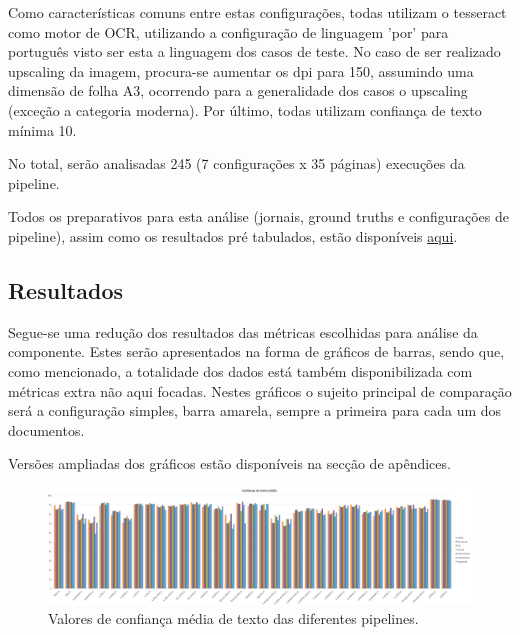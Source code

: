 Como características comuns entre estas configurações, todas utilizam o tesseract como motor de OCR, utilizando a configuração de linguagem 'por' para português visto ser esta a linguagem dos casos de teste. No caso de ser realizado upscaling da imagem, procura-se aumentar os dpi para 150, assumindo uma dimensão de folha A3, ocorrendo para a generalidade dos casos o upscaling (exceção a categoria moderna). Por último, todas utilizam confiança de texto mínima 10.

No total, serão analisadas 245 (7 configurações x 35 páginas) execuções da pipeline.



Todos os preparativos para esta análise (jornais, ground truths e configurações de pipeline), assim como os resultados pré tabulados, estão disponíveis \href{https://drive.google.com/drive/u/0/folders/1DW-AIuSxjEyv6ioq7jX8P1xruy03Sxo9}{aqui}.


\subsection{Resultados}

Segue-se uma redução dos resultados das métricas escolhidas para análise da componente. Estes serão apresentados na forma de gráficos de barras, sendo que, como mencionado, a totalidade dos dados está também disponibilizada com métricas extra não aqui focadas. Nestes gráficos o sujeito principal de comparação será a configuração simples, barra amarela, sempre a primeira para cada um dos documentos.

Versões ampliadas dos gráficos estão disponíveis na secção de apêndices.

\begin{figure}[H]
	\centering
	\hspace*{-2cm}
	\includegraphics[width=1.25\textwidth]{images/resultados/graph_avg_text_conf.png}
	\caption{Valores de confiança média de texto das diferentes pipelines.}
	\label{fig:graph_avg_text_conf}
\end{figure}


